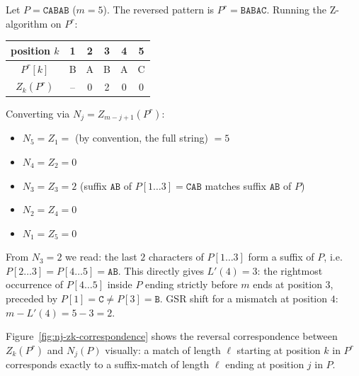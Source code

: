 \begin{example}
  Let $P = \texttt{CABAB}$ ($m=5$).
  The reversed pattern is $P^r = \texttt{BABAC}$.
  Running the Z-algorithm on $P^r$:

  \medskip
  \begin{center}
  \begin{tabular}{c|ccccc}
    position $k$ & 1 & 2 & 3 & 4 & 5 \\
    \hline
    $P^r[k]$     & B & A & B & A & C \\
    $Z_k(P^r)$   & -- & 0 & 2 & 0 & 0 \\
  \end{tabular}
  \end{center}
  \medskip

  Converting via $N_j = Z_{m-j+1}(P^r)$:
  \begin{itemize}[noitemsep, topsep=2pt]
    \item $N_5 = Z_1 = $ (by convention, the full string) $= 5$
    \item $N_4 = Z_2 = 0$
    \item $N_3 = Z_3 = 2$ \quad (suffix $\texttt{AB}$ of $P[1\ldots3]=\texttt{CAB}$ matches suffix $\texttt{AB}$ of $P$)
    \item $N_2 = Z_4 = 0$
    \item $N_1 = Z_5 = 0$
  \end{itemize}

  \noindent
  From $N_3 = 2$ we read: the last $2$ characters of $P[1\ldots3]$ form a
  suffix of $P$, i.e.\ $P[2\ldots3] = P[4\ldots5] = \texttt{AB}$.
  This directly gives $L'(4) = 3$: the rightmost occurrence of $P[4\ldots5]$
  inside $P$ ending strictly before $m$ ends at position $3$, preceded by
  $P[1]=\texttt{C} \neq P[3]=\texttt{B}$.
  GSR shift for a mismatch at position $4$: $m - L'(4) = 5 - 3 = 2$.
\end{example}


Figure~\ref{fig:nj-zk-correspondence} shows the reversal correspondence
between $Z_k(P^r)$ and $N_j(P)$ visually: a match of length $\ell$ starting
at position $k$ in $P^r$ corresponds exactly to a suffix-match of length $\ell$
ending at position $j$ in $P$.

